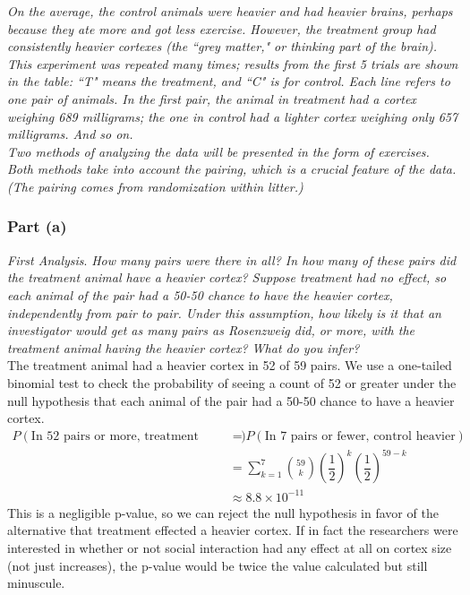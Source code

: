 \documentclass[11pt]{article}
\begin{document}
\noindent \emph{On the average, the control animals were heavier and had heavier brains, perhaps because they ate more and got less exercise. However, the treatment group had consistently heavier cortexes (the ``grey matter," or thinking part of the brain). This experiment was repeated many times; results from the first 5 trials are shown in the table: ``T" means the treatment, and ``C" is for control. Each line refers to one pair of animals. In the first pair, the animal in treatment had a cortex weighing 689 milligrams; the one in control had a lighter cortex weighing only 657 milligrams. And so on.}\\

\noindent \emph{Two methods of analyzing the data will be presented in the form of exercises. Both methods take into account the pairing, which is a crucial feature of the data. (The pairing comes from randomization within litter.)}

\subsubsection*{Part (a)}
\textit{First Analysis}.
\textit{ How many pairs were there in all?
In how many of these pairs did the treatment animal have a heavier cortex?
Suppose treatment had no effect, so each animal of the pair had a 50-50 chance to have the heavier cortex, independently from pair to pair.
Under this assumption, how likely is it that an investigator would get as many pairs as Rosenzweig did, or more, with the treatment animal having the heavier cortex?
What do you infer?}\\

The treatment animal had a heavier cortex in 52 of 59 pairs.  We use a one-tailed binomial test to check the probability of seeing a count of 52 or greater under the null hypothesis that each animal of the pair had a 50-50 chance to have a heavier cortex.
\begin{align*}
P(\text{In 52 pairs or more, treatment heavier}) &= P(\text{In 7 pairs or fewer, control heavier})\\
&= \sum_{k=1}^{7} \binom{59}{k}(\dfrac{1}{2})^{k}(\dfrac{1}{2})^{59-k} \\
&\approx 8.8 \times 10^{-11}
\end{align*}
This is a negligible p-value, so we can reject the null hypothesis in favor of the alternative that treatment effected a heavier cortex.  If in fact the researchers were interested in whether or not social interaction had any effect at all on cortex size (not just increases), the p-value would be twice the value calculated but still minuscule.
\end{document}
